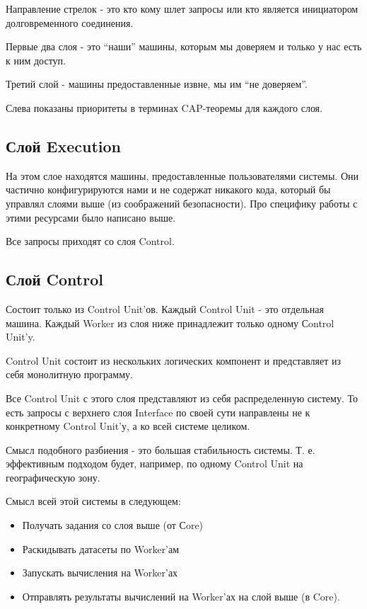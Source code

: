 Направление стрелок - это кто кому шлет запросы или кто является инициатором долговременного соединения.

Первые два слоя - это “наши” машины, которым мы доверяем и только у нас есть к ним доступ.

Третий слой - машины предоставленные извне, мы им “не доверяем”.

Слева показаны приоритеты в терминах CAP-теоремы для каждого слоя.

\subsection{Слой Execution}

На этом слое находятся машины, предоставленные пользователями системы. Они частично конфигурируются нами и не содержат никакого кода, который бы управлял слоями выше (из соображений безопасности). Про специфику работы с этими ресурсами было написано выше.

Все запросы приходят со слоя Control.

\subsection{Слой Control}

Состоит только из Control Unit’ов. Каждый Control Unit - это отдельная машина. Каждый Worker из слоя ниже принадлежит только одному Сontrol Unit’y.

Control Unit состоит из нескольких логических компонент и представляет из себя монолитную программу.

Все Control Unit с этого слоя представляют из себя распределенную систему. То есть запросы с верхнего слоя Interface по своей сути направлены не к конкретному Control Unit'у, а ко всей системе целиком.

Смысл подобного разбиения - это большая стабильность системы. Т. е. эффективным подходом будет, например, по одному Control Unit на географическую зону.

Смысл всей этой системы в следующем:

\begin{itemize}
	\item Получать задания со слоя выше (от Сore)
	\item Раскидывать датасеты по Worker’ам
	\item Запускать вычисления на Worker’ах
	\item Отправлять результаты вычислений на Worker’ах на слой выше (в Core).
\end{itemize}

